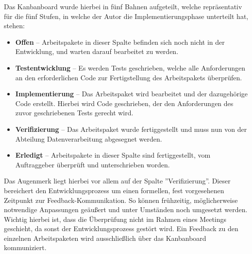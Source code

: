 Das Kanbanboard wurde hierbei in fünf Bahnen aufgeteilt, welche repräsentativ für
die fünf Stufen, in welche der Autor die Implementierungsphase unterteilt hat, stehen:
\begin{itemize}
    \item \textbf{Offen} -- Arbeitspakete in dieser Spalte befinden sich noch
    nicht in der Entwicklung, und warten darauf bearbeitet zu werden.
    \item \textbf{Testentwicklung} -- Es werden Tests geschrieben, welche alle
    Anforderungen an den erforderlichen Code zur Fertigstellung des Arbeitspakets
    überprüfen.
    \item \textbf{Implementierung} -- Das Arbeitspaket wird bearbeitet und der dazugehörige Code erstellt. Hierbei wird Code geschrieben, der den Anforderungen
    des zuvor geschriebenen Tests gerecht wird.
    \item \textbf{Verifizierung} -- Das Arbeitspaket wurde fertiggestellt und
    muss nun von der Abteilung Datenverarbeitung abgesegnet werden.
    \item \textbf{Erledigt} -- Arbeitspakete in dieser Spalte sind fertiggestellt,
    vom Auftraggeber überprüft und unterschrieben worden.
\end{itemize}

Das Augenmerk liegt hierbei vor allem auf der Spalte ''Verifizierung''.
Dieser bereichert den Entwicklungsprozess um einen formellen, fest vorgesehenen
Zeitpunkt zur Feedback-Kommunikation. So können frühzeitig, möglicherweise notwendige Anpassungen geäußert und unter Umständen noch umgesetzt werden. Wichtig hierbei ist, dass die Überprüfung nicht im Rahmen eines Meetings geschieht, da sonst der Entwicklungsprozess gestört wird. Ein Feedback zu den einzelnen Arbeitspaketen wird ausschließlich über das Kanbanboard kommuniziert.\par

